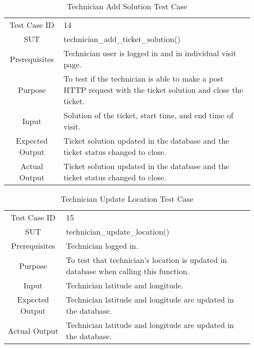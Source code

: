 	\begin{table}[H]
		\centering
		\renewcommand{\arraystretch}{1.5}
		\begin{tabular}[t]{ c  m{10cm} }
			Test Case ID & 14  \\
			SUT & technician\_add\_ticket\_solution() \\
			Prerequisites & Technician user is logged in and in individual visit page. \\
			Purpose & To test if the technician is able to make a post HTTP request with the ticket solution and close the ticket. \\
			Input & Solution of the ticket, start time, and end time of visit. \\
			Expected Output & Ticket solution updated in the database and the ticket status changed to close. \\
			Actual Output & Ticket solution updated in the database and the ticket status changed to close. \\
		\end{tabular}
		\caption{Technician Add Solution Test Case}
		\renewcommand{\arraystretch}{1.0}
	\end{table}
	
	\begin{table}[H]
		\centering
		\renewcommand{\arraystretch}{1.5}
		\begin{tabular}[t]{ c  m{10cm} }
			Test Case ID & 15  \\
			SUT & technician\_update\_location() \\
			Prerequisites & Technician logged in. \\
			Purpose & To test that technician's location is updated in database when calling this function. \\
			Input & Technician latitude and longitude. \\
			Expected Output & Technician latitude and longitude are updated in the database. \\
			Actual Output & Technician latitude and longitude are updated in the database. \\
		\end{tabular}
		\caption{Technician Update Location Test Case}
		\renewcommand{\arraystretch}{1.0}
	\end{table}